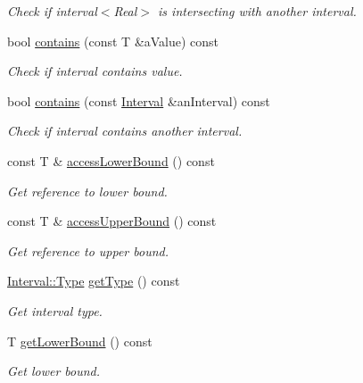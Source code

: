 \begin{DoxyCompactItemize}
\begin{DoxyCompactList}\small\item\em Check if interval$<$\+Real$>$ is intersecting with another interval. \end{DoxyCompactList}\item 
bool \hyperlink{classlibrary_1_1math_1_1obj_1_1_interval_af100f4b53dc3211efde2733c19e458c3}{contains} (const T \&a\+Value) const
\begin{DoxyCompactList}\small\item\em Check if interval contains value. \end{DoxyCompactList}\item 
bool \hyperlink{classlibrary_1_1math_1_1obj_1_1_interval_a3bace75e3cfb5f5c737e642c08572d25}{contains} (const \hyperlink{classlibrary_1_1math_1_1obj_1_1_interval}{Interval} \&an\+Interval) const
\begin{DoxyCompactList}\small\item\em Check if interval contains another interval. \end{DoxyCompactList}\item 
const T \& \hyperlink{classlibrary_1_1math_1_1obj_1_1_interval_ada0dc68134cfacd5a0e959b492cea534}{access\+Lower\+Bound} () const
\begin{DoxyCompactList}\small\item\em Get reference to lower bound. \end{DoxyCompactList}\item 
const T \& \hyperlink{classlibrary_1_1math_1_1obj_1_1_interval_a99692ee706ae6de7cd274ceae3644138}{access\+Upper\+Bound} () const
\begin{DoxyCompactList}\small\item\em Get reference to upper bound. \end{DoxyCompactList}\item 
\hyperlink{classlibrary_1_1math_1_1obj_1_1_interval_abc7177f1c446d8273e70c989953667d1}{Interval\+::\+Type} \hyperlink{classlibrary_1_1math_1_1obj_1_1_interval_a881ab7e17883b4f1553d7e8ba9cc7656}{get\+Type} () const
\begin{DoxyCompactList}\small\item\em Get interval type. \end{DoxyCompactList}\item 
T \hyperlink{classlibrary_1_1math_1_1obj_1_1_interval_a4e01721016dd02dddc93fb012ff7d5b3}{get\+Lower\+Bound} () const
\begin{DoxyCompactList}\small\item\em Get lower bound. \end{DoxyCompactList}\item 

\end{DoxyCompactItemize}
